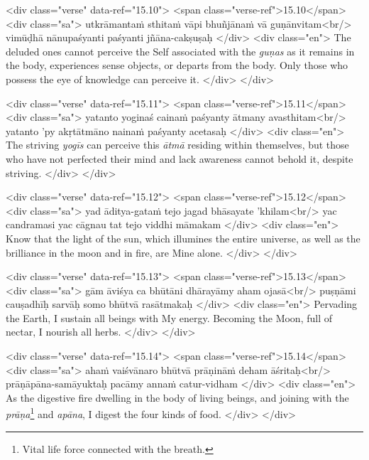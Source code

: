 \begin{html}
<div class="verse" data-ref="15.10">
  <span class="verse-ref">15.10</span>
  <div class="sa">
    utkrāmantaṁ sthitaṁ vāpi bhuñjānaṁ vā guṇānvitam<br/>
    vimūḍhā nānupaśyanti paśyanti jñāna-cakṣuṣaḥ
  </div>
  <div class="en">
    The deluded ones cannot perceive the Self associated with the \textit{guṇas} as it remains in the body, experiences sense objects, or departs from the body. Only those who possess the eye of knowledge can perceive it.
  </div>
</div>
\end{html}



\begin{html}
<div class="verse" data-ref="15.11">
  <span class="verse-ref">15.11</span>
  <div class="sa">
    yatanto yoginaś cainaṁ paśyanty ātmany avasthitam<br/>
    yatanto ’py akṛtātmāno nainaṁ paśyanty acetasaḥ
  </div>
  <div class="en">
    The striving \textit{yogīs} can perceive this \textit{ātmā} residing within themselves, but those who have not perfected their mind and lack awareness cannot behold it, despite striving.
  </div>
</div>
\end{html}



\begin{html}
<div class="verse" data-ref="15.12">
  <span class="verse-ref">15.12</span>
  <div class="sa">
    yad āditya-gataṁ tejo jagad bhāsayate ’khilam<br/>
    yac candramasi yac cāgnau tat tejo viddhi māmakam
  </div>
  <div class="en">
    Know that the light of the sun, which illumines the entire universe, as well as the brilliance in the moon and in fire, are Mine alone.
  </div>
</div>
\end{html}



\begin{html}
<div class="verse" data-ref="15.13">
  <span class="verse-ref">15.13</span>
  <div class="sa">
    gām āviśya ca bhūtāni dhārayāmy aham ojasā<br/>
    puṣṇāmi cauṣadhīḥ sarvāḥ somo bhūtvā rasātmakaḥ
  </div>
  <div class="en">
    Pervading the Earth, I sustain all beings with My energy. Becoming the Moon, full of nectar, I nourish all herbs.
  </div>
</div>
\end{html}



\begin{html}
<div class="verse" data-ref="15.14">
  <span class="verse-ref">15.14</span>
  <div class="sa">
    ahaṁ vaiśvānaro bhūtvā prāṇināṁ deham āśritaḥ<br/>
    prāṇāpāna-samāyuktaḥ pacāmy annaṁ catur-vidham
  </div>
  <div class="en">
    As the digestive fire dwelling in the body of living beings, and joining with the \textit{prāṇa}\footnote{Vital life force connected with the breath.} and \textit{apāna}, I digest the four kinds of food.
  </div>
</div>
\end{html}



